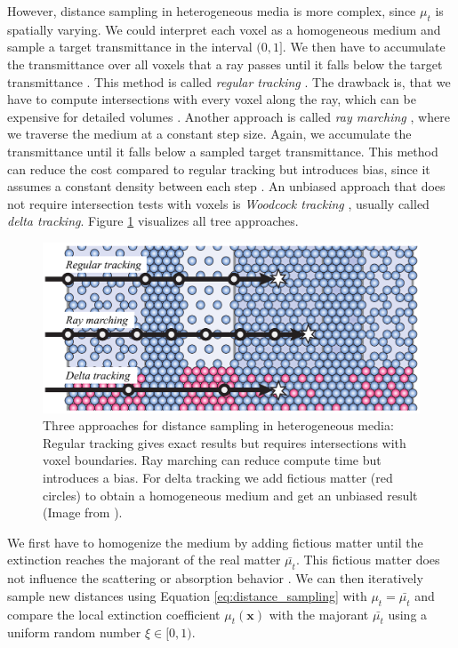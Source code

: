However, distance sampling in heterogeneous media is more complex, since $\mu_t$ is spatially varying.
We could interpret each voxel as a homogeneous medium and sample a target transmittance in the interval $(0, 1]$.
We then have to accumulate the transmittance over all voxels that a ray passes until it falls below the target transmittance \cite{novak_overview}.
This method is called \textit{regular tracking} \cite{sutton_regular_tracking}.
The drawback is, that we have to compute intersections with every voxel along the ray, which can be expensive for detailed volumes \cite{novak_overview}.
Another approach is called \textit{ray marching} \cite{perlin_hypertexture}, where we traverse the medium at a constant step size.
Again, we accumulate the transmittance until it falls below a sampled target transmittance.
This method can reduce the cost compared to regular tracking but introduces bias, since it assumes a constant density between each step \cite{novak_overview}.
An unbiased approach that does not require intersection tests with voxels is \textit{Woodcock tracking} \cite{woodcock}, usually called \textit{delta tracking}.
Figure \ref{fig:novak_distance_sampling} visualizes all tree approaches.
\begin{figure}[t]
    \centering
    \includegraphics[width=0.7\linewidth]{img/novak_distance_sampling.png}
    \caption[Approaches for distance sampling in heterogeneous media]{Three approaches for distance sampling in heterogeneous media: Regular tracking gives exact results but requires intersections with voxel boundaries. Ray marching can reduce compute time but introduces a bias. For delta tracking we add fictious matter (red circles) to obtain a homogeneous medium and get an unbiased result (Image from \cite{novak_overview}).}
    \label{fig:novak_distance_sampling}
\end{figure}
We first have to homogenize the medium by adding fictious matter until the extinction reaches the majorant of the real matter $\bar{\mu_t}$.
This fictious matter does not influence the scattering or absorption behavior \cite{novak_overview}.
We can then iteratively sample new distances using Equation \ref{eq:distance_sampling} with $\mu_t=\bar{\mu_t}$ and compare the local extinction coefficient $\mu_t(\boldsymbol{x})$ with the majorant $\bar{\mu_t}$ using a uniform random number $\xi\in[0,1)$.
